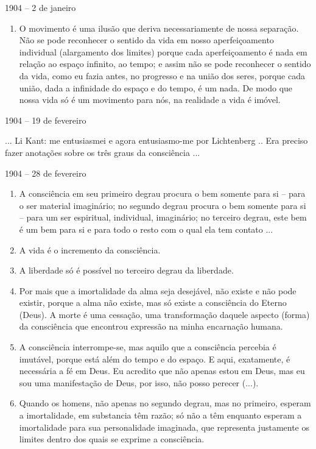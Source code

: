 1904 -- 2 de janeiro

\begin{enumerate}
\def\labelenumi{\arabic{enumi})}
\item
  O movimento é uma ilusão que deriva necessariamente de nossa
  separação. Não se pode reconhecer o sentido da vida em nosso
  aperfeiçoamento individual (alargamento dos limites) porque cada
  aperfeiçoamento é nada em relação ao espaço infinito, ao tempo; e
  assim não se pode reconhecer o sentido da vida, como eu fazia antes,
  no progresso e na união dos seres, porque cada união, dada a
  infinidade do espaço e do tempo, é um nada. De modo que nossa vida só
  é um movimento para nós, na realidade a vida é imóvel.
\end{enumerate}

1904 -- 19 de fevereiro

... Li Kant: me entusiasmei e agora entusiasmo-me por Lichtenberg .. Era
preciso fazer anotações sobre os três graus da consciência ...

1904 -- 28 de fevereiro

\begin{enumerate}
\def\labelenumi{\arabic{enumi})}
\item
  A consciência em seu primeiro degrau procura o bem somente para si --
  para o ser material imaginário; no segundo degrau procura o bem
  somente para si -- para um ser espiritual, individual, imaginário; no
  terceiro degrau, este bem é um bem para si e para todo o resto com o
  qual ela tem contato ...
\item
  A vida é o incremento da consciência.
\item
  A liberdade só é possível no terceiro degrau da liberdade.
\item
  Por mais que a imortalidade da alma seja desejável, não existe e não
  pode existir, porque a alma não existe, mas só existe a consciência do
  Eterno (Deus). A morte é uma cessação, uma transformação daquele
  aspecto (forma) da consciência que encontrou expressão na minha
  encarnação humana.
\item
  A consciência interrompe-se, mas aquilo que a consciência percebia é
  imutável, porque está além do tempo e do espaço. E aqui, exatamente, é
  necessária a fé em Deus. Eu acredito que não apenas estou em Deus, mas
  eu sou uma manifestação de Deus, por isso, não posso perecer (...).
\item
  Quando os homens, não apenas no segundo degrau, mas no primeiro,
  esperam a imortalidade, em substancia têm razão; só não a têm enquanto
  esperam a imortalidade para sua personalidade imaginada, que
  representa justamente os limites dentro dos quais se exprime a
  consciência.
\end{enumerate}

